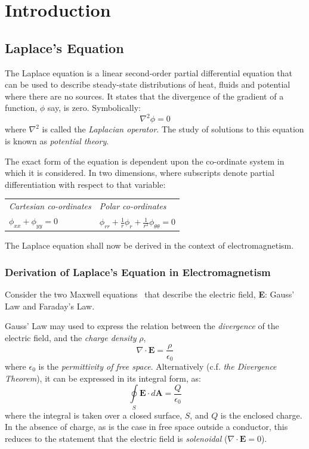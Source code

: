 \documentclass[11pt, a4paper]{article}
\newcommand{\be}{\begin{equation}}
\newcommand{\ee}{\end{equation}}
\begin{document}
\section{Introduction}
\subsection{Laplace's Equation}

The Laplace equation is a linear second-order partial differential equation that can be
used to describe steady-state distributions of heat, fluids and potential where there
are no sources. It states that the divergence of the gradient of a function, $\phi$ say,
is zero. Symbolically:
%
\be
\nabla ^2 \phi = 0
\ee
%
where $\nabla^2$ is called the \emph{Laplacian operator}. The study of solutions to
this equation is known as \emph{potential theory}.

The exact form of the equation is dependent upon the co-ordinate system in
which it is considered. In two dimensions, where subscripts denote partial
differentiation with respect to that variable:

\begin{center}
\begin{tabularx}{0.6\textwidth}{|Y|Y|}
\hline
\emph{Cartesian co-ordinates} & \emph{Polar co-ordinates} \\
$\phi_{xx}+\phi_{yy}=0$ & $\phi_{rr}+\frac{1}{r}\phi_r+\frac{1}{r^2}\phi_{\theta \theta}=0$ \\
\hline
\end{tabularx}
\end{center}

The Laplace equation shall now be derived in the context of electromagnetism.

\subsubsection{Derivation of Laplace's Equation in Electromagnetism}
Consider the two Maxwell equations~\cite{em} that describe the electric field,
\textbf{E}: Gauss' Law and Faraday's Law.

Gauss' Law may used to express the relation between the \emph{divergence} of the
electric field, and the \emph{charge density} $\rho$,
%
\be
\nabla \cdot \bm{E} = \frac{\rho}{\epsilon_0}
\ee
%
where $\epsilon_0$ is the \emph{permittivity of free space}. Alternatively (c.f.
\emph{the Divergence Theorem}), it can be expressed in its integral form, as:
%
\be
\oint \limits_S \bm{E} \cdot d\bm{A} = \frac{Q}{\epsilon_0}
\ee
%
where the integral is taken over a closed surface, $S$, and $Q$ is the enclosed charge.
In the absence of charge, as is the case in free space outside a conductor, this
reduces to the statement that the electric field is \emph{solenoidal}
($\nabla \cdot \bm{E}=0$).
\end{document}
